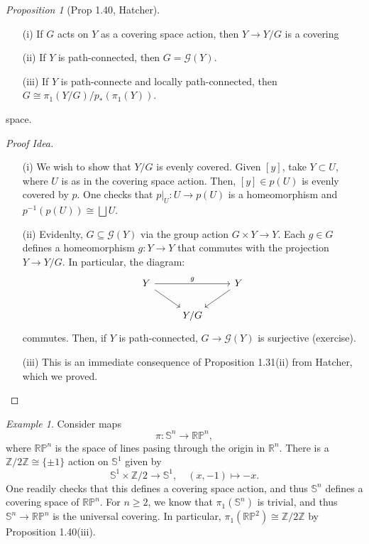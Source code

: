 \documentclass[a4paper]{report}
\theoremstyle{definition}
\theoremstyle{remark}
\theoremstyle{proposition}
\newtheorem{proposition}{Proposition}
\theoremstyle{conjecture}
\theoremstyle{lemma}
\theoremstyle{corollary}
\theoremstyle{exercise}
\newtheorem{example}{Example}
\newcommand{\mcal}{\mathcal}
\begin{document}
\begin{proposition}[Prop 1.40, Hatcher]
    \begin{itemize}
        \item[(i)] If $G$ acts on $Y$ as a covering space action, then $Y \to Y/G$ is a covering 
        \item[(ii)] If $Y$ is path-connected, then $G = \mcal{G}(Y)$. 
        \item[(iii)] If $Y$ is path-connecte and 
    locally path-connected, then $G \cong \pi_1(Y/G)/p_\ast(\pi_1(Y))$.

    \end{itemize}
    space.
\end{proposition}

\begin{proof}[Proof Idea]
    \begin{itemize}
        \item[(i)] We wish to show that $Y/G$ is evenly covered. Given $[y]$, take $Y \subset U$,
        where $U$ is as in the covering space action. Then, $[y] \in p(U)$ is 
        evenly covered by $p$. One checks that $p\vert_U : U \to p(U)$ is a 
        homeomorphism and $p^{-1}(p(U)) \cong \bigsqcup U$.
        \item[(ii)] Evidenlty, $G \subseteq \mcal{G}(Y)$ via the group action $G \times Y \to Y$.
        Each $g \in G$ defines a homeomorphism $g : Y \to Y$ that commutes with the projection 
        $Y \to Y/G$. In particular, the diagram: 
        $$\begin{tikzcd}
            Y \arrow[rd] \arrow[rr, "g"] &     & Y \arrow[ld] \\
                                         & Y/G &             
            \end{tikzcd}$$
        commutes. Then, if $Y$ is path-connected, $G \to \mcal{G}(Y)$ is surjective (exercise). 
        \item[(iii)] This is an immediate consequence of Proposition 1.31(ii) from Hatcher, which we proved.
    \end{itemize}
\end{proof}

\begin{example}
    Consider maps 
    $$\pi : \mathbb{S}^n \longrightarrow \mathbb{RP}^n,$$
    where $\mathbb{RP}^n$ is the space of lines pasing through the origin in 
    $\mathbb{R}^n$. There is a $\mathbb{Z}/2\mathbb{Z} \cong \lbrace \pm 1\rbrace$ action on $\mathbb{S}^1$ 
    given by $$\mathbb{S}^1 \times \mathbb{Z}/2 \longrightarrow \mathbb{S}^1,\quad (x,-1) \longmapsto -x.$$
    One readily checks that this defines a covering space action, and thus $\mathbb{S}^n$ defines a 
    covering space of $\mathbb{RP}^n$.
    For $n \geq 2$, we know that $\pi_1(\mathbb{S}^n)$ is trivial, and thus 
    $\mathbb{S}^n \to \mathbb{RP}^n$ is the universal covering. In particular, 
    $\pi_1(\mathbb{RP}^2) \cong \mathbb{Z}/2\mathbb{Z}$ by Proposition 1.40(iii).
\end{example}
\end{document}
